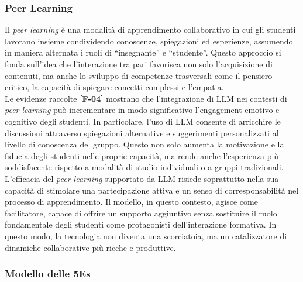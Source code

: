 \documentclass[a4paper,9pt]{article}
\begin{document}
\subsubsection{Peer Learning}

Il \textit{peer learning} è una modalità di apprendimento collaborativo in cui gli studenti lavorano insieme condividendo conoscenze, spiegazioni ed esperienze, assumendo in maniera alternata i ruoli di “insegnante” e “studente”. Questo approccio si fonda sull’idea che l’interazione tra pari favorisca non solo l’acquisizione di contenuti, ma anche lo sviluppo di competenze trasversali come il pensiero critico, la capacità di spiegare concetti complessi e l’empatia.\\
Le evidenze raccolte \textbf{[F-04]} mostrano che l’integrazione di LLM nei contesti di \textit{peer learning} può incrementare in modo significativo l’engagement emotivo e cognitivo degli studenti. In particolare, l’uso di LLM consente di arricchire le discussioni attraverso spiegazioni alternative e suggerimenti personalizzati al livello di conoscenza del gruppo. Questo non solo aumenta la motivazione e la fiducia degli studenti nelle proprie capacità, ma rende anche l’esperienza più soddisfacente rispetto a modalità di studio individuali o a gruppi tradizionali. L’efficacia del \textit{peer learning} supportato da LLM risiede soprattutto nella sua capacità di stimolare una partecipazione attiva e un senso di corresponsabilità nel processo di apprendimento. Il modello, in questo contesto, agisce come facilitatore, capace di offrire un supporto aggiuntivo senza sostituire il ruolo fondamentale degli studenti come protagonisti dell’interazione formativa. In questo modo, la tecnologia non diventa una scorciatoia, ma un catalizzatore di dinamiche collaborative più ricche e produttive.

\subsubsection{Modello delle 5Es}
\end{document}
